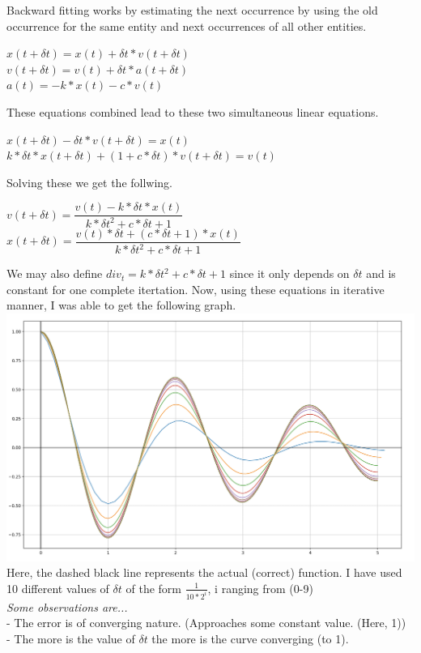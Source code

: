 \documentclass{article}
\begin{document}
        Backward fitting works by estimating the next occurrence by using the old occurrence for the same entity and next occurrences of all other entities.
                \begin{center}
                \(x(t+\delta t) = x(t) + \delta t*v(t + \delta t)\) \\
                \(v(t+\delta t) = v(t) + \delta t*a(t + \delta t)\) \\
                \(a(t) = - k*x(t) - c*v(t)\) \\
                \end{center}
        These equations combined lead to these two simultaneous linear equations.
                \begin{center}
                \(x(t+\delta t) - \delta t*v(t + \delta t) = x(t)\) \\
                \(k*\delta t*x(t+\delta t) + (1+c*\delta t)*v(t+\delta t) = v(t)\) \\
                \end{center}
        Solving these we get the follwing.
                \begin{center}
                \(v(t + \delta t) = \dfrac{v(t) - k*\delta t*x(t)}{k*\delta t^2 + c*\delta t + 1}\) \\[10pt]
                \(x(t+\delta t) = \dfrac{v(t)*\delta t + (c*\delta t + 1)*x(t)}{k*\delta t^2 + c*\delta t + 1}\) \\
                \end{center}
        We may also define  \(div_t = k*\delta t^2 + c*\delta t + 1\) since it only depends on \(\delta t\) and is constant for one complete itertation. 
        \pagebreak
        Now, using these equations in iterative manner, I was able to get the following graph. \\
        \includegraphics[scale=.25]{../Backward.png} \\
        Here, the dashed black line represents the actual (correct) function. I have used 10 different values of \(\delta t\) of the form \(\frac{1}{10 * 2^i}\), i ranging from (0-9) \\[20pt]
        \textit{Some observations are...} \\
             - The error is of converging nature. (Approaches some constant value. (Here, 1)) \\
             - The more is the value of \(\delta t\) the more is the curve converging (to 1).
\end{document}
